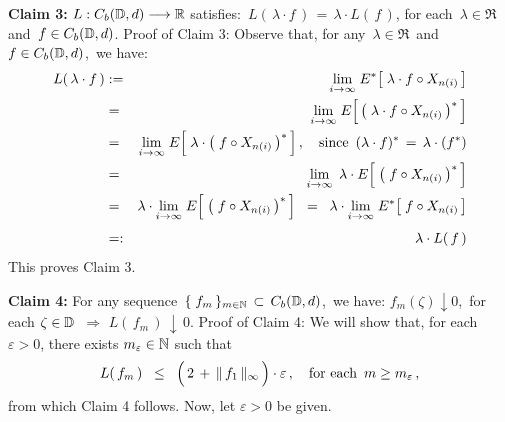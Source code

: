 \vskip 0.5cm
\noindent
\textbf{Claim 3:}\;\;
$L : C_{b}(\mathbb{D},d) \longrightarrow \mathbb{R}$ satisfies:\,
$L(\,\lambda\cdot f\,) \,=\, \lambda \cdot L(\,f\,)$,\;
for each \,$\lambda \in \Re$\, and \,$f \in C_{b}(\mathbb{D},d)$.
\vskip 0.2cm
\noindent
Proof of Claim 3:\;\;
Observe that, for any \,$\lambda \in \Re$\, and \,$f \in C_{b}(\mathbb{D},d)$,\, we have:
\begin{eqnarray*}
L(\,\lambda \cdot f\,)
&:=&
	\underset{i\rightarrow\infty}{\lim}\;
	E^{*}\!\left[\; \lambda \cdot f \circ X_{n(i)} \,\right]
\\
& \overset{{\color{white}1}}{=} &
	\underset{i\rightarrow\infty}{\lim}\;
	E\!\left[\,\left(\; \lambda \cdot f \circ X_{n(i)} \,\right)^{*}\,\right]
\\
& \overset{{\color{white}1}}{=} &
	\underset{i\rightarrow\infty}{\lim}\;
	E\!\left[\; \lambda \cdot \left(\; f \circ X_{n(i)}\,\right)^{*} \,\right],
	\quad
	\textnormal{since \,$(\lambda \cdot f)^{*} \,=\, \lambda \cdot (f^{*})$}
\\
& \overset{{\color{white}1}}{=} &
	\underset{i\rightarrow\infty}{\lim}\;\,
	\lambda \cdot E\!\left[\;\left(\; f \circ X_{n(i)}\,\right)^{*} \,\right]
\\
& \overset{{\color{white}1}}{=} &
	\lambda \cdot
	\underset{i\rightarrow\infty}{\lim}\;
	E\!\left[\;\left(\; f \circ X_{n(i)}\,\right)^{*} \,\right]
\;\; = \;\;
	\lambda \cdot
	\underset{i\rightarrow\infty}{\lim}\;
	E^{*}\!\left[\; f \circ X_{n(i)} \,\right]
\\
& \overset{{\color{white}1}}{=:} &
	\lambda \cdot L(\,f\,)
\end{eqnarray*}
This proves Claim 3.

\vskip 0.5cm
\noindent
\textbf{Claim 4:}\;\;
For any sequence \,$\{\;f_{m}\,\}_{m\in\mathbb{N}} \,\subset\, C_{b}(\mathbb{D},d)$,\,
we have:\;
$f_{m}(\zeta) \downarrow 0$,\, for each $\zeta \in \mathbb{D}$
\;\,$\Longrightarrow$\;
$L(\,f_{m}\,) \,\downarrow\, 0$.
\vskip 0.2cm
\noindent
Proof of Claim 4:\;\;
We will show that, for each $\varepsilon > 0$, there exists $m_{\varepsilon} \in \mathbb{N}$ such that
\begin{equation*}
L(\,f_{m}\,)
\;\; \leq \;\;
	\left(\,2 \, \overset{{\color{white}.}}{+} \, \Vert\,f_{1}\,\Vert_{\infty} \,\right) \cdot \varepsilon\,,
\quad
\textnormal{for each \,$m \geq m_{\varepsilon}$}\,,
\end{equation*}
from which Claim 4 follows. Now, let $\varepsilon > 0$ be given.

